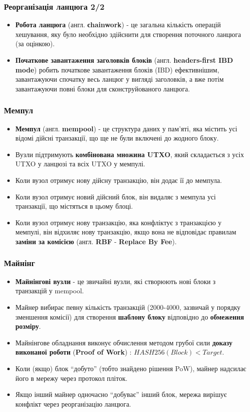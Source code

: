 \documentclass{beamer}
\begin{document}
\begin{frame}
  \frametitle{Реорганізація ланцюга 2/2}
  \begin{itemize}
  \item \textbf{Робота ланцюга} (англ. \textbf{сhainwork}) - це загальна
    кількість операцій хешування, яку було необхідно здійснити для створення
    поточного ланцюга (за оцінкою).
  \item \textbf{Початкове завантаження заголовків блоків}
    (англ. \textbf{headers-first IBD mode}) робить початкове завантаження блоків
    (IBD) ефективнішим, завантажуючи спочатку весь ланцюг у вигляді заголовків,
    а вже потім завантажуючи повні блоки для сконструйованого ланцюга.
  \end{itemize}
\end{frame}

\begin{frame}
  \frametitle{Мемпул}
  \begin{itemize}
  \item \textbf{Мемпул} (англ. \textbf{mempool}) - це структура даних у пам'яті,
    яка містить усі відомі дійсні транзакції, що ще не були включені до жодного
    блоку.
  \item Вузли підтримують \textbf{комбінована множина UTXO}, який складається з
    усіх UTXO у ланцюзі та всіх UTXO у мемпулі.
  \item Коли вузол отримує нову дійсну транзакцію, він додає її до мемпула.
  \item Коли вузол отримує новий дійсний блок, він видаляє з мемпула усі
    транзакції, що містяться в цьому блоці.
  \item Коли вузол отримує нову транзакцію, яка конфліктує з транзакцією у
    мемпулі, він відхиляє нову транзакцію, якщо вона не відповідає правилам
    \textbf{заміни за комісією} (англ. \textbf{RBF} - \textbf{Replace By Fee}).
  \end{itemize}
\end{frame}

\begin{frame}
  \frametitle{Майнінг}
  \begin{itemize}
  \item \textbf{Майнінгові вузли} - це звичайні вузли, які створюють нові блоки
    з транзакцій у mempool.
  \item Майнер вибирає певну кількість транзакцій (2000-4000, зазвичай у порядку
    зменшення комісії) для створення \textbf{шаблону блоку} відповідно до
    \textbf{обмеження розміру}.
  \item Майнінгове обладнання виконує обчислення методом грубої сили
    \textbf{доказу виконаної роботи} (\textbf{Proof of Work}) :
    $HASH256(Block) < Target$.
  \item Коли (якщо) блок ``добуто'' (тобто знайдено рішення PoW), майнер
    надсилає його в мережу через протокол пліток.
  \item Якщо інший майнер одночасно ``добуває'' інший блок, мережа вирішує
    конфлікт через реорганізацію ланцюга.
  \end{itemize}
\end{frame}
\end{document}

